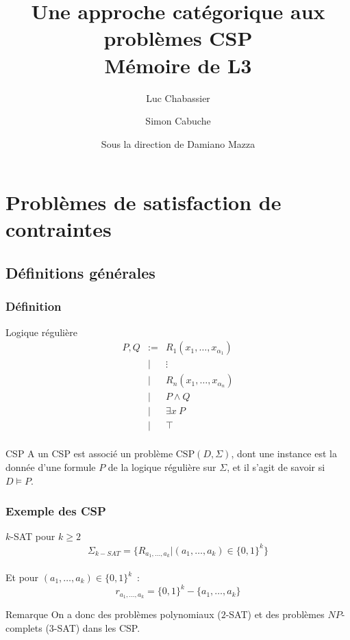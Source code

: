 \documentclass[12pt]{beamer}
\author{Luc Chabassier\and Simon Cabuche}
\title[CSP catégoriques]
    {Une approche catégorique aux problèmes CSP\\
        {\normalsize Mémoire de L3}}
\institute{\begin{center}École Normale Supérieure\\
    DMA
\end{center}}
\date{\small Sous la direction de Damiano Mazza}
\newcommand\csp{\text{CSP}}
\begin{document}

\begin{frame}
    \maketitle
\end{frame}

\begin{frame}
    \tableofcontents
\end{frame}

\section[CSP]{Problèmes de satisfaction de contraintes}

\subsection{Définitions générales}

\begin{frame}
    \frametitle{Définition}

    \begin{block}{Logique régulière}
        \[\begin{array}{rcl}
        P,Q & := & R_1(x_1, \dots, x_{\alpha_1}) \\
        & |  & \vdots                        \\
        & |  & R_n(x_1, \dots, x_{\alpha_n}) \\
        & |  & P \wedge Q                    \\
        & |  & \exists x \ P                  \\
        & |  & \top                          \\
        \end{array}\]
    \end{block}
    \pause
    \begin{block}{CSP}
        A un CSP est associé un problème $\csp (D,\Sigma)$, dont une instance est la
        donnée d'une formule $P$ de la logique régulière sur $\Sigma$, et il s'agit de
        savoir si $D \models P$.
    \end{block}
\end{frame}

\begin{frame}
    \frametitle{Exemple des CSP}

    \begin{exampleblock}{$k$-SAT pour $k\geq 2$}
        $$\Sigma_{k-SAT} = \{R_{a_1,\dots,a_k}|(a_1,\dots,a_k) \in \{0,1\}^k\}$$\\ Et
        pour $(a_1,\dots,a_k) \in \{0,1\}^k$~: $$r_{a_1,\dots,a_k} = \{0,1\}^k -
        \{a_1,\dots,a_k\} $$
    \end{exampleblock}
    \pause
    \begin{alertblock}{Remarque}
        On a donc des problèmes polynomiaux ($2$-SAT) et des problèmes $NP$-complets
        ($3$-SAT) dans les CSP.
    \end{alertblock}
\end{frame}
\end{document}
